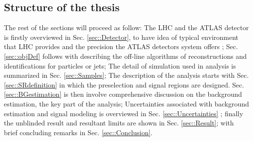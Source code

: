 \subsection{Structure of the thesis}
The rest of the sections will proceed as follow: 
The LHC and the ATLAS detector is firstly overviewed in Sec. \ref{sec::Detector}, 
to have idea of typical environment that LHC provides and 
the precision the ATLAS detectors system offers ; 
Sec. \ref{sec::objDef} follows with describing the off-line algorithms of reconstructions and identifications for particles or jets; 
The detail of simulation used in analysis is summarized in Sec. \ref{sec::Samples}; 
The description of the analysis starts with Sec. \ref{sec::SRdefinition} in which the preselection and signal regions are designed. Sec. \ref{sec::BGestimation} is then involve comprehensive discussion on the background estimation, the key part of the analysis;
Uncertainties associated with background estimation and signal modeling is overviewed in Sec. \ref{sec::Uncertainties}
; finally the unblinded result and resultant limits are shown in Sec. \ref{sec::Result}; 
with brief concluding remarks in Sec. \ref{sec::Conclusion}.


